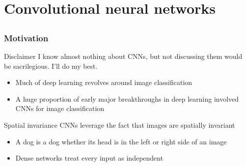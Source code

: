 \section[CNNs]{Convolutional neural networks}

\subsection{}

\begin{frame}
    \frametitle{Motivation}

    \begin{block}{Disclaimer}
        I know almost nothing about CNNs, but not discussing them would be sacrilegious.
        I'll do my best.
    \end{block}
    \pause

    \begin{itemize}
        \item Much of deep learning revolves around image classification
        \item A huge proportion of early major breakthroughs in deep learning involved CNNs for image classification
    \end{itemize}
    \pause

    \begin{block}{Spatial invariance}
        CNNs leverage the fact that images are \alert{spatially invariant}
        \begin{itemize}
            \item A dog is a dog whether its head is in the left or right side of an image
            \item Dense networks treat every input as independent
        \end{itemize}
    \end{block}
\end{frame}

